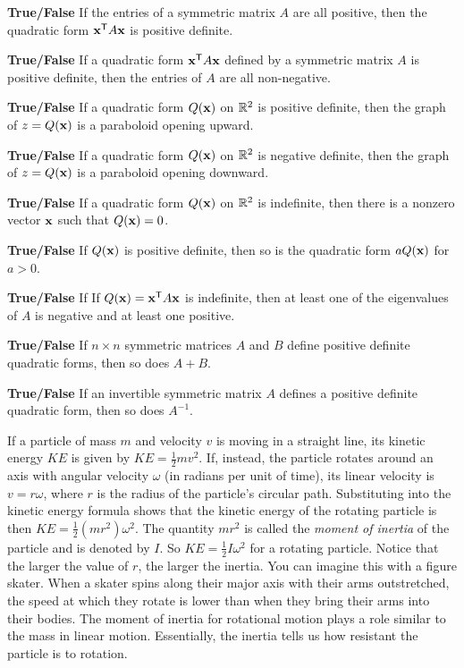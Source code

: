 	\item \textbf{True/False} If the entries of a symmetric matrix $A$ are all positive, then the quadratic form $\mathbf{x}^{\mathsf{T}}A\mathbf{x}$ is positive definite. 


	\item \textbf{True/False} If a quadratic form $\mathbf{x}^{\mathsf{T}}A \mathbf{x}$ defined by a symmetric matrix $A$ is positive definite, then the entries of $A$ are all non-negative. 


\item \textbf{True/False} If a quadratic form $Q(\mathbf{x})$ on $\mathbb{R}^2$ is positive definite, then the graph of $z=Q(\mathbf{x})$ is a paraboloid opening upward.

\item \textbf{True/False} If a quadratic form $Q(\mathbf{x})$ on $\mathbb{R}^2$ is negative definite, then the graph of $z=Q(\mathbf{x})$ is a paraboloid opening downward.

\item \textbf{True/False} If a quadratic form $Q(\mathbf{x})$ on $\mathbb{R}^2$ is indefinite, then there is a nonzero vector $\mathbf{x}$ such that $Q(\mathbf{x}) = 0$. 

\item \textbf{True/False} If $Q(\mathbf{x})$ is positive definite, then so is the quadratic form $aQ(\mathbf{x})$ for $a>0$.

\item \textbf{True/False} If If $Q(\mathbf{x})=\mathbf{x}^{\mathsf{T}} A\mathbf{x}$ is indefinite, then at least one of the eigenvalues of $A$ is negative and at least one positive.

\item \textbf{True/False} If $n \times n$ symmetric matrices $A$ and $B$ define positive definite quadratic forms, then so does $A+B$.

\item \textbf{True/False} If an invertible symmetric matrix $A$ defines a positive definite quadratic form, then so does $A^{-1}$.


	 \ea
	 
\ee


If a particle of mass $m$ and velocity $v$ is moving in a straight line, its kinetic energy $KE$ is given by $KE = \frac{1}{2}mv^2$. If, instead, the particle rotates around an axis with angular velocity $\omega$ (in radians per unit of time), its linear velocity is $v = r \omega$, where $r$ is the radius of the particle's circular path. Substituting into the kinetic energy formula shows that the kinetic energy of the rotating particle is then $KE = \frac{1}{2}\left(mr^2\right) \omega^2$. The quantity $mr^2$ is called the \emph{moment of inertia} of the particle and is denoted by $I$. So $KE = \frac{1}{2}I\omega^2$ for a rotating particle. Notice that the larger the value of $r$, the larger the inertia. You can imagine this with a figure skater. When a skater spins along their major axis with their arms outstretched, the speed at which they rotate is lower than when they bring their arms into their bodies. The moment of inertia for rotational motion plays a role similar to the mass in linear motion. Essentially, the inertia tells us how resistant the particle is to rotation. 

